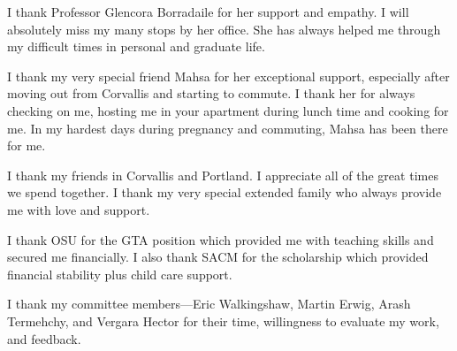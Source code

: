 I thank Professor Glencora Borradaile for her support and empathy. I will absolutely miss my many stops by her office. She has always helped me through my difficult times in personal and graduate life.

I thank my very special friend Mahsa for her exceptional support, especially after moving out from Corvallis and starting to commute. I thank her for always checking on me, hosting me in your apartment during lunch time and cooking for me. In my hardest days during pregnancy and commuting, Mahsa has been there for me.

I thank my friends in Corvallis and Portland. I appreciate all of the great times we spend together. I thank my very special extended family who always provide me with love and support.

I thank OSU for the GTA position which provided me with teaching skills and secured me financially. I also thank SACM for the scholarship which provided financial stability plus child care support.

I thank my committee members---Eric Walkingshaw, Martin Erwig, Arash Termehchy, and Vergara Hector for their time, willingness to evaluate my work, and feedback.